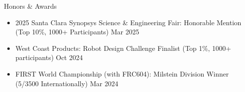 \documentclass[
  10pt, %
]{resume}
\begin{document}

\begin{rSection}{Honors \& Awards}

  \begin{itemize}
      \setlength\itemsep{-0.7em} %
      \item 2025 Santa Clara Synopsys Science \& Engineering Fair: Honorable Mention (Top 10\%, 1000+ Participants) \hfill Mar 2025
      \item West Coast Products: Robot Design Challenge Finalist (Top 1\%, 1000+ participants) \hfill Oct 2024
      \item FIRST World Championship (with FRC604): Milstein Division Winner (5/3500 Internationally) \hfill Mar 2024

    \end{itemize}

\end{rSection}
\end{document}
